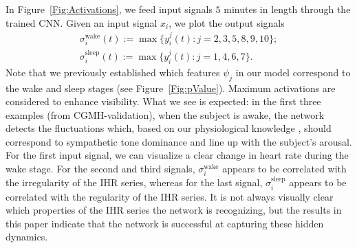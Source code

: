\documentclass[10pt,a4paper,english]{amsart}
\begin{document}
 \begin{figure*}
\centering
{}
\hspace{0.5in} 
\caption{\label{Fig:pValue} At each time $t$, we assess the predictive potential of the $10$ features $\psi_j$ learned by the CNN model. The black colour in the $(j, t)$-entry of (a) (resp. (b)) indicates that the feature $\psi_j$ is useful for identifying the wake (resp. sleep) stage when it occurs at sample $t$.}
\end{figure*}

In Figure~\ref{Fig:Activations}, we feed input signals $5$ minutes in length through the trained CNN. Given an input signal $x_i$, we plot the output signals
\begin{gather}
\sigma_i^{\mathrm{wake}}(t) := \max \{ y_i^j(t) : j = 2, 3, 5, 8,9, 10 \}; \label{Eq:Wake}\\
\sigma_i^{\mathrm{sleep}}(t) := \max\{y_i^j(t) : j = 1, 4, 6, 7 \} \label{Eq:Sleep}.
\end{gather}
Note that we previously established which features $\psi_j$ in our model correspond to the wake and sleep stages (see Figure~\ref{Fig:pValue}).  Maximum activations are considered to enhance visibility.  What we see is expected: in the first three examples (from CGMH-validation), when the subject is awake, the network detects the fluctuations which, based on our physiological knowledge \cite{Snyder:1964,Somers:1993}, should correspond to sympathetic tone dominance and line up with the subject's arousal. For the first input signal, we can visualize a clear change in heart rate during the wake stage.  For the second and third signals, $\sigma_i^\mathrm{wake}$ appears to be correlated with the irregularity of the IHR series, whereas for the last signal, $\sigma_i^{\mathrm{sleep}}$ appears to be correlated with the regularity of the IHR series.  It is not always visually clear which properties of the IHR series the network is recognizing, but the results in this paper indicate that the network is successful at capturing these hidden dynamics.
\end{document}
